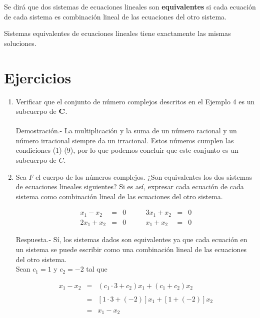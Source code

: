 Se dirá que dos sistemas de ecuaciones lineales son \textbf{equivalentes} si cada ecuación de cada sistema es combinación lineal de las ecuaciones del otro sistema.\\

\begin{teo}
    Sistemas equivalentes de ecuaciones lineales tiene exactamente las mismas soluciones.
\end{teo}

\section*{Ejercicios}

\begin{enumerate}[\bfseries 1.]

    \item Verificar que el conjunto de número complejos descritos en el Ejemplo 4 es un subcuerpo de $\bf{C}$.\\\\
	Demostración.-\; La multiplicación y la suma de un número racional y un número irracional siempre da un irracional. Estos números cumplen las condiciones (1)-(9), por lo que podemos concluir que este conjunto es un subcuerpo de $C$.\\

    \item Sea $F$ el cuerpo de los números complejos. ¿Son equivalentes los dos sistemas de ecuaciones lineales siguientes? Si es así, expresar cada ecuación de cada sistema como combinación lineal de las ecuaciones del otro sistema.

    $$\begin{array}{rcl}
	x_1-x_2&=&0\\
	2x_1+x_2&=&0
    \end{array} \qquad 
    \begin{array}{rcl}
	3x_1+x_2&=&0\\
	x_1+x_2&=&0
    \end{array}$$
    \vspace{.4cm}

	Respuesta.-\; Sí, los sistemas dados son equivalentes ya que cada ecuación en un sistema se puede escribir como una combinación lineal de las ecuaciones del otro sistema.\\

	Sean $c_1=1$ y $c_2=-2$ tal que

	$$\begin{array}{rcl}
	    x_1-x_2&=&(c_1\cdot 3+ c_2)x_1 + (c_1+c_2)x_2\\\\
		   &=&\left[1\cdot 3+(-2)\right]x_1+\left[1+(-2)\right]x_2\\\\
		   &=&x_1-x_2
	\end{array}$$ 


\end{enumerate}
